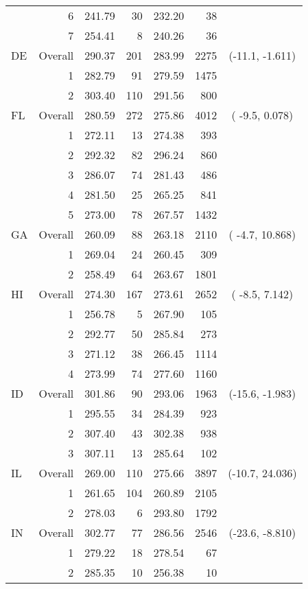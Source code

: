\begin{longtable}{lrrr@{\extracolsep{.25cm}}rrc}
   & 6 & 241.79 &  30 & 232.20 &  38 &  \\ 
   & 7 & 254.41 &   8 & 240.26 &  36 &  \\ 
   \hline
DE & Overall & 290.37 & 201 & 283.99 & 2275 & (-11.1, -1.611) \\ 
   & 1 & 282.79 &  91 & 279.59 & 1475 &  \\ 
   & 2 & 303.40 & 110 & 291.56 & 800 &  \\ 
   \hline
FL & Overall & 280.59 & 272 & 275.86 & 4012 & ( -9.5,  0.078) \\ 
   & 1 & 272.11 &  13 & 274.38 & 393 &  \\ 
   & 2 & 292.32 &  82 & 296.24 & 860 &  \\ 
   & 3 & 286.07 &  74 & 281.43 & 486 &  \\ 
   & 4 & 281.50 &  25 & 265.25 & 841 &  \\ 
   & 5 & 273.00 &  78 & 267.57 & 1432 &  \\ 
   \hline
GA & Overall & 260.09 &  88 & 263.18 & 2110 & ( -4.7, 10.868) \\ 
   & 1 & 269.04 &  24 & 260.45 & 309 &  \\ 
   & 2 & 258.49 &  64 & 263.67 & 1801 &  \\ 
   \hline
HI & Overall & 274.30 & 167 & 273.61 & 2652 & ( -8.5,  7.142) \\ 
   & 1 & 256.78 &   5 & 267.90 & 105 &  \\ 
   & 2 & 292.77 &  50 & 285.84 & 273 &  \\ 
   & 3 & 271.12 &  38 & 266.45 & 1114 &  \\ 
   & 4 & 273.99 &  74 & 277.60 & 1160 &  \\ 
   \hline
ID & Overall & 301.86 &  90 & 293.06 & 1963 & (-15.6, -1.983) \\ 
   & 1 & 295.55 &  34 & 284.39 & 923 &  \\ 
   & 2 & 307.40 &  43 & 302.38 & 938 &  \\ 
   & 3 & 307.11 &  13 & 285.64 & 102 &  \\ 
   \hline
IL & Overall & 269.00 & 110 & 275.66 & 3897 & (-10.7, 24.036) \\ 
   & 1 & 261.65 & 104 & 260.89 & 2105 &  \\ 
   & 2 & 278.03 &   6 & 293.80 & 1792 &  \\ 
   \hline
IN & Overall & 302.77 &  77 & 286.56 & 2546 & (-23.6, -8.810) \\ 
   & 1 & 279.22 &  18 & 278.54 &  67 &  \\ 
   & 2 & 285.35 &  10 & 256.38 &  10 &  \\ 

\end{longtable}
